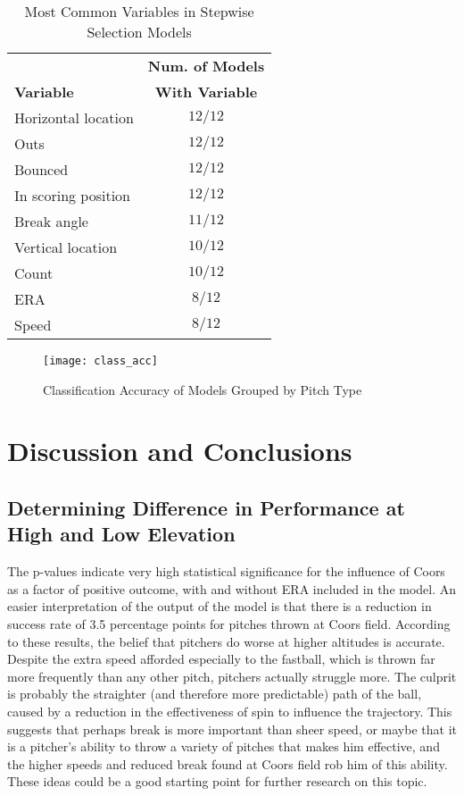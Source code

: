 \documentclass{article}
\begin{document}
\begin{table}[h!]
\centering
\small
\setlength\tabcolsep{2pt}
\caption{Most Common Variables in Stepwise Selection Models}
\begin{tabular}{ |l|c| }
 \hline
  & \textbf{Num. of Models} \\
 \textbf{Variable} & \textbf{With Variable} \\
 \hline
 Horizontal location & \(12/12\) \\
 Outs & \(12/12\) \\
 Bounced & \(12/12\) \\
 In scoring position & \(12/12\) \\
 Break angle & \(11/12\) \\
 Vertical location & \(10/12\) \\
 Count & \(10/12\) \\
 ERA & \(8/12\) \\
 Speed & \(8/12\) \\
 \hline
\end{tabular}
\end{table}

\begin{figure}[h!]
\begin{center}
\texttt{[image: class\_acc]}
\caption{Classification Accuracy of Models Grouped by Pitch Type}
\end{center}
\end{figure}


\section{Discussion and Conclusions}

\subsection{Determining Difference in Performance at High and Low Elevation}

The p-values indicate very high statistical significance for the influence of Coors as a factor of positive outcome, with and without ERA included in the model. An easier interpretation of the output of the model is that there is a reduction in success rate of 3.5 percentage points for pitches thrown at Coors field. According to these results, the belief that pitchers do worse at higher altitudes is accurate. Despite the extra speed afforded especially to the fastball, which is thrown far more frequently than any other pitch, pitchers actually struggle more. The culprit is probably the straighter (and therefore more predictable) path of the ball, caused by a reduction in the effectiveness of spin to influence the trajectory. This suggests that perhaps break is more important than sheer speed, or maybe that it is a pitcher's ability to throw a variety of pitches that makes him effective, and the higher speeds and reduced break found at Coors field rob him of this ability. These ideas could be a good starting point for further research on this topic.
\end{document}
